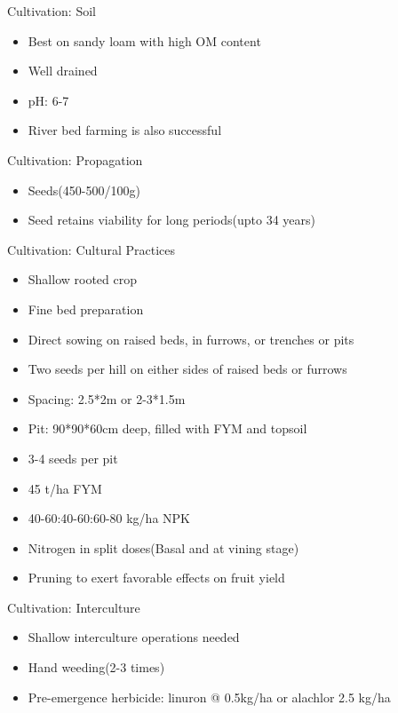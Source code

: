 \documentclass[
  ignorenonframetext,
  aspectratio=169]{beamer}
\providecommand{\tightlist}{%
  \setlength{\itemsep}{0pt}\setlength{\parskip}{0pt}}
\begin{document}
\begin{frame}{Cultivation: Soil}
\protect\hypertarget{cultivation-soil}{}
\begin{itemize}
\tightlist
\item
  Best on sandy loam with high OM content
\item
  Well drained
\item
  pH: 6-7
\item
  River bed farming is also successful
\end{itemize}
\end{frame}

\begin{frame}{Cultivation: Propagation}
\protect\hypertarget{cultivation-propagation}{}
\begin{itemize}
\tightlist
\item
  Seeds(450-500/100g)
\item
  Seed retains viability for long periods(upto 34 years)
\end{itemize}
\end{frame}

\begin{frame}{Cultivation: Cultural Practices}
\protect\hypertarget{cultivation-cultural-practices}{}
\begin{itemize}
\tightlist
\item
  Shallow rooted crop
\item
  Fine bed preparation
\item
  Direct sowing on raised beds, in furrows, or trenches or pits
\item
  Two seeds per hill on either sides of raised beds or furrows
\item
  Spacing: 2.5*2m or 2-3*1.5m
\item
  Pit: 90*90*60cm deep, filled with FYM and topsoil
\item
  3-4 seeds per pit
\item
  45 t/ha FYM
\item
  40-60:40-60:60-80 kg/ha NPK
\item
  Nitrogen in split doses(Basal and at vining stage)
\item
  Pruning to exert favorable effects on fruit yield
\end{itemize}
\end{frame}

\begin{frame}{Cultivation: Interculture}
\protect\hypertarget{cultivation-interculture}{}
\begin{itemize}
\tightlist
\item
  Shallow interculture operations needed
\item
  Hand weeding(2-3 times)
\item
  Pre-emergence herbicide: linuron @ 0.5kg/ha or alachlor 2.5 kg/ha
\end{itemize}
\end{frame}
\end{document}
